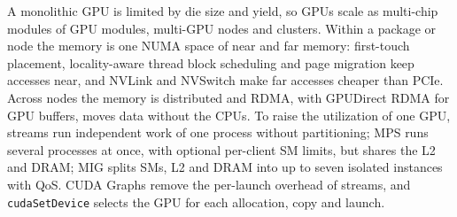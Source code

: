 \documentclass[../main.tex]{subfiles}
\begin{document}
\begin{keypoint}
  A monolithic GPU is limited by die size and yield, so GPUs scale as
  multi-chip modules of GPU modules, multi-GPU nodes and clusters.
  Within a package or node the memory is one NUMA space of near and far
  memory: first-touch placement, locality-aware thread block scheduling
  and page migration keep accesses near, and NVLink and NVSwitch make
  far accesses cheaper than PCIe.  Across nodes the memory is
  distributed and RDMA, with GPUDirect RDMA for GPU buffers, moves data
  without the CPUs.  To raise the utilization of one GPU, streams run
  independent work of one process without partitioning; MPS runs several
  processes at once, with optional per-client SM limits, but shares the
  L2 and DRAM; MIG splits SMs,
  L2 and DRAM into up to seven isolated instances with QoS.  CUDA Graphs
  remove the per-launch overhead of streams, and \texttt{cudaSetDevice}
  selects the GPU for each allocation, copy and launch.
\end{keypoint}
\end{document}
